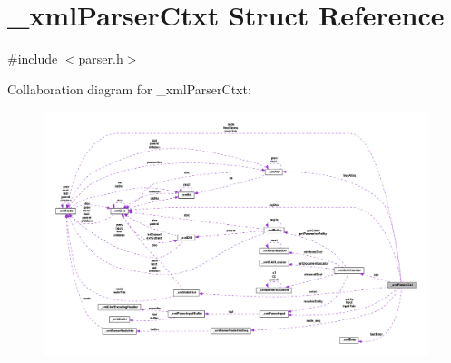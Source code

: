 \hypertarget{struct__xml_parser_ctxt}{\section{\-\_\-xml\-Parser\-Ctxt Struct Reference}
\label{struct__xml_parser_ctxt}
}


{\ttfamily \#include $<$parser.\-h$>$}



Collaboration diagram for \-\_\-xml\-Parser\-Ctxt\-:
\nopagebreak
\begin{figure}[H]
\begin{center}
\leavevmode
\includegraphics[width=350pt]{struct__xml_parser_ctxt__coll__graph}
\end{center}
\end{figure}
